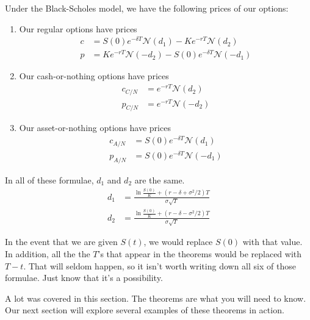 \documentclass{ximera}
\begin{document}
\begin{theorem}
Under the Black-Scholes model, we have the following prices of our options:
	\begin{enumerate}
	\item Our regular options have prices
		\begin{align*}
		c 	&=S(0)e^{-\delta T}\mathcal{N}(d_1)-Ke^{-rT}\mathcal{N}(d_2)\\
		p 	&=Ke^{-rT}\mathcal{N}(-d_2)-S(0)e^{-\delta T}\mathcal{N}(-d_1)
		\end{align*}
	\item Our cash-or-nothing options have prices
		\begin{align*}
		c_{C/N} 	&=e^{-rT}\mathcal{N}(d_2)\\
		p_{C/N} 	&=e^{-rT}\mathcal{N}(-d_2)
		\end{align*}
	\item Our asset-or-nothing options have prices
		\begin{align*}
		c_{A/N} 	&=S(0)e^{-\delta T}\mathcal{N}(d_1)\\
		p_{A/N} 	&=S(0)e^{-\delta T}\mathcal{N}(-d_1)
		\end{align*}
	\end{enumerate}
In all of these formulae, $d_1$ and $d_2$ are the same.
	\begin{align*}
	d_1 	&=\frac{\ln\frac{S(0)}{K}+(r-\delta+\sigma^2/2)T}{\sigma\sqrt{T}}\\
	d_2 	&=\frac{\ln\frac{S(0)}{K}+(r-\delta-\sigma^2/2)T}{\sigma\sqrt{T}}
	\end{align*}
\end{theorem}

In the event that we are given $S(t)$, we would replace $S(0)$ with that value. In addition, all the the $T$'s that appear in the theorems would be replaced with $T-t$. That will seldom happen, so it isn't worth writing down all six of those formulae. Just know that it's a possibility. 

A lot was covered in this section. The theorems are what you will need to know. Our next section will explore several examples of these theorems in action.
\end{document}

